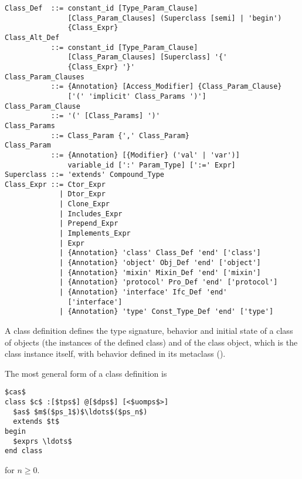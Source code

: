 \syntax\begin{lstlisting}
Class_Def  ::= constant_id [Type_Param_Clause] 
               [Class_Param_Clauses] (Superclass [semi] | 'begin')
               {Class_Expr}
Class_Alt_Def
           ::= constant_id [Type_Param_Clause] 
               [Class_Param_Clauses] [Superclass] '{'
               {Class_Expr} '}'
Class_Param_Clauses 
           ::= {Annotation} [Access_Modifier] {Class_Param_Clause}
               ['(' 'implicit' Class_Params ')']
Class_Param_Clause
           ::= '(' [Class_Params] ')'
Class_Params 
           ::= Class_Param {',' Class_Param}
Class_Param 
           ::= {Annotation} [{Modifier} ('val' | 'var')]
               variable_id [':' Param_Type] [':=' Expr]
Superclass ::= 'extends' Compound_Type
Class_Expr ::= Ctor_Expr
             | Dtor_Expr
             | Clone_Expr
             | Includes_Expr
             | Prepend_Expr
             | Implements_Expr
             | Expr
             | {Annotation} 'class' Class_Def 'end' ['class']
             | {Annotation} 'object' Obj_Def 'end' ['object']
             | {Annotation} 'mixin' Mixin_Def 'end' ['mixin']
             | {Annotation} 'protocol' Pro_Def 'end' ['protocol']
             | {Annotation} 'interface' Ifc_Def 'end' 
               ['interface']
             | {Annotation} 'type' Const_Type_Def 'end' ['type']
\end{lstlisting}

A class definition defines the type signature, behavior and initial state of a class of objects (the instances of the defined class) and of the class object, which is the class instance itself, with behavior defined in its metaclass (). 

The most general form of a class definition is
\begin{lstlisting}
$cas$
class $c$ :[$tps$] @[$dps$] [<$uomps$>] 
  $as$ $m$($ps_1$)$\ldots$($ps_n$)
  extends $t$
begin
  $exprs \ldots$
end class
\end{lstlisting}
for $n \geq 0$. 

